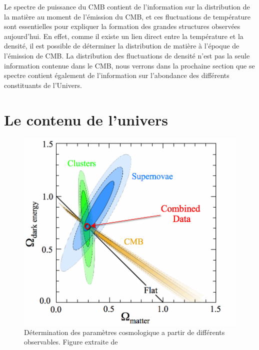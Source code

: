 
Le spectre de puissance du \ac{CMB} contient de l'information sur la distribution de la matière au moment de l'émission du \ac{CMB}, et ces fluctuations de température sont essentielles pour expliquer la formation des grandes structures observées aujourd'hui.
En effet, comme il existe un lien direct entre la température et la densité, il est possible de déterminer la distribution de matière à l'époque de l'émission de \ac{CMB}.
La distribution des fluctuations de densité n'est pas la seule information contenue dans le \ac{CMB}, nous verrons dans la prochaine section que se spectre contient également de l'information sur l'abondance des différents constituants de l'Univers.

\section{Le contenu de l'univers}
\label{cosmoparam}

\begin{figure}
        \includegraphics[width=.95\linewidth]{img/01/cosmoparam.png} 
        \caption[Determination des paramètres cosmologique]{Détermination des paramètres cosmologique a partir de différents observables. Figure extraite de \cite{2008ApJ...686..749K}}
 		\label{fig:cosmoparam}
\end{figure}

